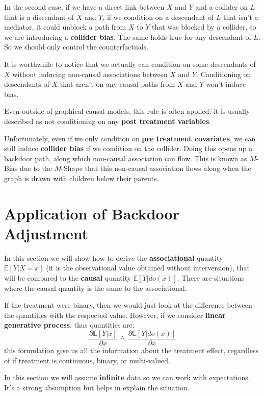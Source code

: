 In the second case, if we have a direct link between $X$ and $Y$ and a collider 
on $L$ that is a discendant of $X$ and $Y$, if we condition on a descendant of $L$ 
that isn't a mediator, it could unblock a path 
from $X$ to $Y$ that was blocked by a collider, so we are introducing a \textbf{collider bias}. 
The same holds true for any descendant of $L$. So we should only control the counterfactuals.

It is worthwhile to notice that we actually can condition on some descendants of $X$ 
without inducing non-causal associations between $X$ and $Y$.
Conditioning on descendants of $X$ that aren't on any causal paths from $X$ and $Y$
won't induce bias.

Even outside of graphical causal models, this rule is often applied; it is usually described 
as not conditioning on any \textbf{post treatment variables}.

Unfortunately, even if we only condition on \textbf{pre treatment covariates}, we can still 
induce \textbf{collider bias} if we condition on the collider.
Doing this opens up a backdoor path, along which non-causal association can flow. This is 
known as $M$-Bias due to the $M$-Shape that this non-causal association flows along 
when the graph is drawn with children below their parents.

\section{Application of Backdoor Adjustment}
In this section we will show how to derive the \textbf{associational} quantity 
$\mathbb{E}[Y|X = x]$ (it is the observational value obtained without interversion),
 that will be compared to the \textbf{causal} quantity $\mathbb{E}[Y|do(x)]$. There 
 are situations where the causal quantity is the same to the associational.

If the treatment were binary, then we would just look at the difference between 
the quantities with the respected value. However, if we consider \textbf{linear 
generative process}, thus quantities are:
\begin{equation}
    \frac{\partial\mathbb{E}[Y |x]}{\partial x } \, \land \, \frac{\partial\mathbb{E}[Y |do(x)]}{\partial x}
\end{equation}
this formulation give us all the information about the treatment effect, regardless of if treatment is continuous, binary, or multi-valued.

\begin{note}
    In this section we will assume \textbf{infinite} data so we can work with expectations. 
    It's a strong absumption but helps in explain the situation. 
\end{note}

